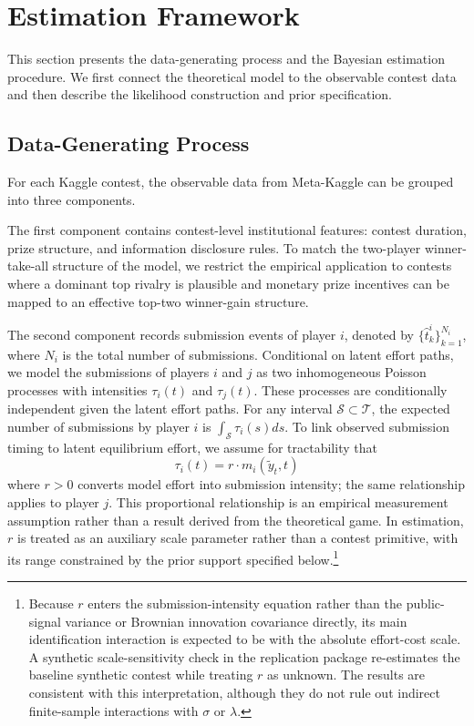 \documentclass[mnsc]{informs3}
\begin{document}
\section{Estimation Framework}\label{sect-bayes-framework}

This section presents the data-generating process and the Bayesian estimation procedure.
We first connect the theoretical model to the observable contest data and then describe the likelihood construction and prior specification.

\subsection{Data-Generating Process}

For each Kaggle contest, the observable data from Meta-Kaggle can be grouped into three components.

The first component contains contest-level institutional features: contest duration, prize structure, and information disclosure rules.
To match the two-player winner-take-all structure of the model, we restrict the empirical application to contests where a dominant top rivalry is plausible and monetary prize incentives can be mapped to an effective top-two winner-gain structure.

The second component records submission events of player $i$, denoted by $\{\hat{t}^i_k\}_{k=1}^{N_i}$, where $N_i$ is the total number of submissions.
Conditional on latent effort paths, we model the submissions of players $i$ and $j$ as two inhomogeneous Poisson processes with intensities $\tau_i(t)$ and $\tau_j(t)$. These processes are conditionally independent given the latent effort paths.
For any interval $\mathcal{S}\subset\mathcal{T}$, the expected number of submissions by player $i$ is $\int_{\mathcal{S}}\tau_i(s)ds$.
To link observed submission timing to latent equilibrium effort, we assume for tractability that
\begin{equation}\label{eq-model-intensity}
\tau_i(t) = r \cdot m_i(\tilde{y}_t, t)
\end{equation}
where \(r>0\) converts model effort into submission intensity; the same relationship applies to player \(j\). This proportional relationship is an empirical measurement assumption rather than a result derived from the theoretical game. In estimation, \(r\) is treated as an auxiliary scale parameter rather than a contest primitive, with its range constrained by the prior support specified below.\footnote{
Because $r$ enters the submission-intensity equation rather than the public-signal variance or Brownian innovation covariance directly, its main identification interaction is expected to be with the absolute effort-cost scale. 
A synthetic scale-sensitivity check in the replication package re-estimates the baseline synthetic contest while treating $r$ as unknown. 
The results are consistent with this interpretation, although they do not rule out indirect finite-sample interactions with $\sigma$ or $\lambda$.
}
\end{document}
